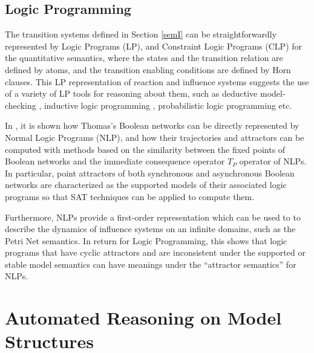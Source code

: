 \documentclass[graybox]{svmult}
\begin{document}
  


\subsection{Logic Programming}

The transition systems defined in Section \ref{semI} can be straightforwardly represented by Logic Programs (LP), and Constraint Logic Programs (CLP) for the quantitative semantics,
where the states and the transition relation are defined by atoms, and the transition enabling conditions are defined by Horn clauses.
This LP representation of reaction and influence systems suggests the use of a variety of LP tools for reasoning about them,
such as deductive model-checking \cite{DP01sttt,CF03cmsb}, inductive logic programming \cite{Muggleton95ngc,FS08pilp}, probabilistic logic programming \cite{AM02etai} etc.

In \cite{Inoue11ijcai}, it is shown how Thomas's Boolean networks can be directly represented by Normal Logic Programs (NLP),
and how their trajectories and attractors can be computed with methods based on
the similarity between the fixed points of Boolean networks and the immediate consequence operator $T_P$ operator of NLPs.
In particular, point attractors of both synchronous and asynchronous Boolean networks are characterized as the supported models of their associated logic programs so that SAT techniques can be applied to compute them.

Furthermore, NLPs provide a first-order representation which can be used to 
to describe the dynamics of influence systems on an infinite domains, such as the Petri Net semantics.
In return for Logic Programming, this shows that
logic programs that have cyclic attractors and are inconsistent under the supported or stable model semantics \cite{Fages94mlcs}
can have meanings under the ``attractor semantics'' for NLPs.



\section{Automated Reasoning on Model Structures}\label{graph}
\end{document}
